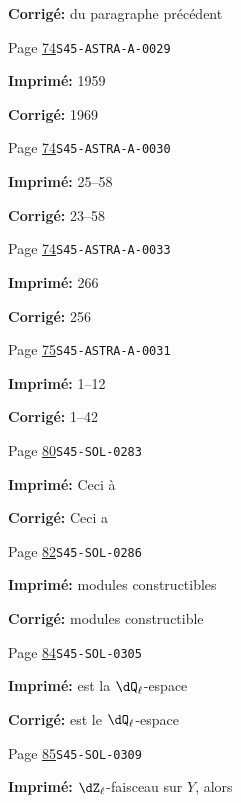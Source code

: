 \documentclass[oneside]{book}
\theoremstyle{sga-source}
\theoremstyle{sga-source-dash}
\theoremstyle{sga-source-dotdash}
\theoremstyle{sga-source-number-note-dash}
\theoremstyle{sga-source-note-number-dotdash}
\theoremstyle{sga-source-example-dotdash}
\theoremstyle{sga-source-inline-number}
\theoremstyle{sga-source-bare-number}
\theoremstyle{sga-source}
\begin{document}
\begin{description}
\par\noindent\textbf{Corrigé:} du paragraphe précédent
\smallskip
\item[\hypertarget{apparatus:FR-0032}{32}] Page \hyperlink{printpage:fr:74}{74}\quad\texttt{S45-ASTRA-A-0029}
\par\noindent\textbf{Imprimé:} 1959
\par\noindent\textbf{Corrigé:} 1969
\smallskip
\item[\hypertarget{apparatus:FR-0033}{33}] Page \hyperlink{printpage:fr:74}{74}\quad\texttt{S45-ASTRA-A-0030}
\par\noindent\textbf{Imprimé:} 25--58
\par\noindent\textbf{Corrigé:} 23--58
\smallskip
\item[\hypertarget{apparatus:FR-0034}{34}] Page \hyperlink{printpage:fr:74}{74}\quad\texttt{S45-ASTRA-A-0033}
\par\noindent\textbf{Imprimé:} 266
\par\noindent\textbf{Corrigé:} 256
\smallskip
\item[\hypertarget{apparatus:FR-0035}{35}] Page \hyperlink{printpage:fr:75}{75}\quad\texttt{S45-ASTRA-A-0031}
\par\noindent\textbf{Imprimé:} 1--12
\par\noindent\textbf{Corrigé:} 1--42
\smallskip
\item[\hypertarget{apparatus:FR-0036}{36}] Page \hyperlink{printpage:fr:80}{80}\quad\texttt{S45-SOL-0283}
\par\noindent\textbf{Imprimé:} Ceci à
\par\noindent\textbf{Corrigé:} Ceci a
\smallskip
\item[\hypertarget{apparatus:FR-0037}{37}] Page \hyperlink{printpage:fr:82}{82}\quad\texttt{S45-SOL-0286}
\par\noindent\textbf{Imprimé:} modules constructibles
\par\noindent\textbf{Corrigé:} modules constructible
\smallskip
\item[\hypertarget{apparatus:FR-0038}{38}] Page \hyperlink{printpage:fr:84}{84}\quad\texttt{S45-SOL-0305}
\par\noindent\textbf{Imprimé:} est la $\dQ_\ell$-espace
\par\noindent\textbf{Corrigé:} est le $\dQ_\ell$-espace
\smallskip
\item[\hypertarget{apparatus:FR-0039}{39}] Page \hyperlink{printpage:fr:85}{85}\quad\texttt{S45-SOL-0309}
\par\noindent\textbf{Imprimé:} $\dZ_\ell$-faisceau sur $Y$, alors

\end{description}
\end{document}
